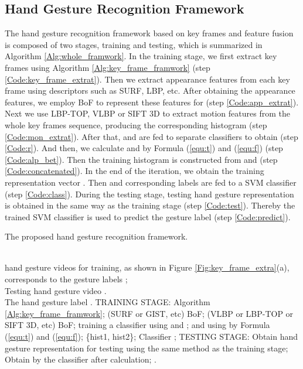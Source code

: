 \documentclass[5p]{elsarticle}
\begin{document}
\subsection{Hand Gesture Recognition Framework}
The hand gesture recognition framework based on key frames and feature fusion is composed of two stages, training and testing, which is summarized in Algorithm \ref{Alg:whole_framwork}.
In the training stage, we first extract key frames  using Algorithm \ref{Alg:key_frame_framwork} (step \ref{Code:key_frame_extrat}).
Then we extract appearance features from each key frame using descriptors such as SURF, LBP, etc.
After obtaining the appearance features, we employ BoF \cite{liu2016sequential,dardas2011real} to represent these features for  (step \ref{Code:app_extrat}).
Next we use LBP-TOP, VLBP or SIFT 3D to extract motion features from the whole key frames sequence, producing the corresponding histogram  (step \ref{Code:mon_extrat}).
After that,  and  are fed to separate classifiers to obtain  (step \ref{Code:r}).
And then, we calculate  and  by Formula (\ref{equ:t}) and (\ref{equ:f}) (step \ref{Code:alp_bet}).
Then the training histogram  is constructed from  and  (step \ref{Code:concatenated}).
In the end of the iteration, we obtain the training representation vector .
Then  and corresponding labels  are fed to a SVM classifier (step \ref{Code:class}).
During the testing stage, testing hand gesture representation is obtained in the same way as the training stage (step \ref{Code:test}).
Thereby the trained SVM classifier is used to predict the gesture label  (step \ref{Code:predict}).

\begin{algorithm}[!t] \small
	\caption{The proposed hand gesture recognition framework.}
	\label{Alg:whole_framwork}
	\begin{algorithmic}[1]
		\REQUIRE ~~\\
		 hand gesture videos for training, as shown in Figure \ref{Fig:key_frame_extra}(a), corresponds to the gesture labels ; \\
		Testing hand gesture video .
		\ENSURE ~~\\
		The hand gesture label .
		\STATE TRAINING STAGE:
		\STATE   Algorithm \ref{Alg:key_frame_framwork}; \label{Code:key_frame_extrat}
		\STATE   (SURF or GIST, etc)  BoF; \label{Code:app_extrat}
		\STATE   (VLBP or LBP-TOP or SIFT 3D, etc)  BoF; \label{Code:mon_extrat}
		\STATE   training a classifier using  and  ; \label{Code:r}
		\STATE  and   using by Formula (\ref{equ:t}) and (\ref{equ:f}); \label{Code:alp_bet}
		\STATE   \{hist1, hist2\}; \label{Code:concatenated}
		\ENDFOR
		\STATE Classifier    ; \label{Code:class}
		\STATE TESTING STAGE:
		\STATE Obtain hand gesture representation  for testing  using the same method as the training stage; \label{Code:test}
		\STATE Obtain  by the classifier after calculation; \label{Code:predict}
		\RETURN .
	\end{algorithmic}
\end{algorithm}
\end{document}

